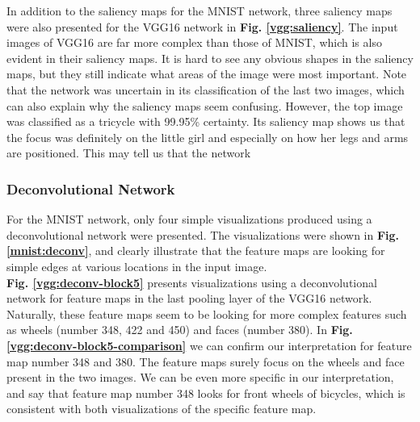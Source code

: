 \noindent In addition to the saliency maps for the MNIST network, three saliency maps were also presented for the VGG16 network in \textbf{Fig. \ref{vgg:saliency}}. The input images of VGG16 are far more complex than those of MNIST, which is also evident in their saliency maps. It is hard to see any obvious shapes in the saliency maps, but they still indicate what areas of the image were most important. Note that the network was uncertain in its classification of the last two images, which can also explain why the saliency maps seem confusing. However, the top image was classified as a tricycle with 99.95\% certainty. Its saliency map shows us that the focus was definitely on the little girl and especially on how her legs and arms are positioned. This may tell us that the network %




\begin{comment}
The saliency map indicates to what degree each pixel in the visualization image influences the specific class outcome. The important regions are easily identified by their brightness. The saliency map can help you to see which parts of the visualization image that your network deems more important when deciding upon the classification score chosen.
\end{comment}

\subsubsection{Deconvolutional Network}

For the MNIST network, only four simple visualizations produced using a deconvolutional network were presented. The visualizations were shown in \textbf{Fig. \ref{mnist:deconv}}, and clearly illustrate that the feature maps are looking for simple edges at various locations in the input image. \\

\noindent \textbf{Fig. \ref{vgg:deconv-block5}} presents visualizations using a deconvolutional network for feature maps in the last pooling layer of the VGG16 network. Naturally, these feature maps seem to be looking for more complex features such as wheels (number 348, 422 and 450) and faces (number 380). In \textbf{Fig. \ref{vgg:deconv-block5-comparison}} we can confirm our interpretation for feature map number 348 and 380. The feature maps surely focus on the wheels and face present in the two images. We can be even more specific in our interpretation, and say that feature map number 348 looks for front wheels of bicycles, which is consistent with both visualizations of the specific feature map. \\

